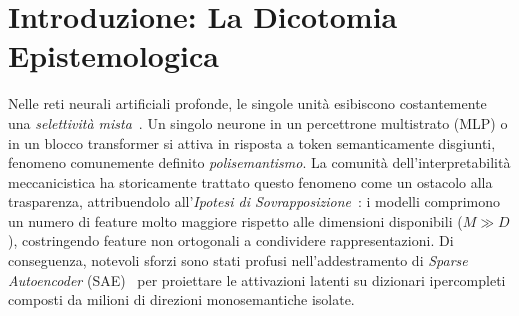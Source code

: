 \documentclass[11pt,a4paper]{article}
\theoremstyle{definition}
\begin{document}
\begin{abstract}
ancoraggio, intercettando la deriva non verificata mediante \textit{Errori Semantici} deterministici (\textit{Semantic Faults}).
\vspace{0.35cm}
\end{abstract}

\section{Introduzione: La Dicotomia Epistemologica}

Nelle reti neurali artificiali profonde, le singole unità esibiscono costantemente una \textit{selettività mista}~\cite{rigotti2013importance, elhage2022toy}. Un singolo neurone in un percettrone multistrato (MLP) o in un blocco transformer si attiva in risposta a token semanticamente disgiunti, fenomeno comunemente definito \textit{polisemantismo}. La comunità dell'interpretabilità meccanicistica ha storicamente trattato questo fenomeno come un ostacolo alla trasparenza, attribuendolo all'\textit{Ipotesi di Sovrapposizione}~\cite{elhage2022toy}: i modelli comprimono un numero di feature molto maggiore rispetto alle dimensioni disponibili ($M \gg D$), costringendo feature non ortogonali a condividere rappresentazioni. Di conseguenza, notevoli sforzi sono stati profusi nell'addestramento di \textit{Sparse Autoencoder} (SAE)~\cite{bricken2023monosemanticity, templeton2024scaling, cunningham2023sparse} per proiettare le attivazioni latenti su dizionari ipercompleti composti da milioni di direzioni monosemantiche isolate.
\end{document}
